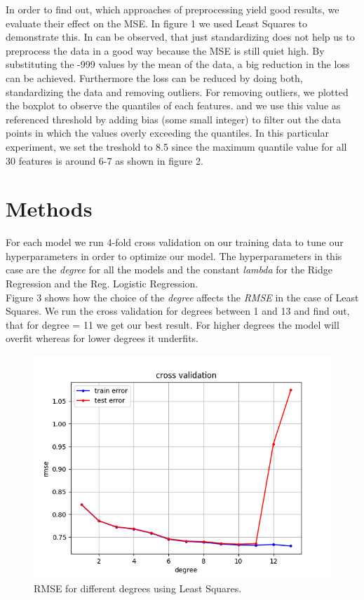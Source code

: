 \documentclass[10pt,conference,compsocconf]{IEEEtran}
\begin{document}
In order to find out, which approaches of preprocessing yield good results, we evaluate their effect on the MSE. In figure 1 we used Least Squares to demonstrate this. In can be observed, that just standardizing does not help us to preprocess the data in a good way because the MSE is still quiet high. 
By substituting the -999 values by the mean of the data, a big reduction in the loss can be achieved. Furthermore the loss can be reduced by doing both, standardizing the data and removing outliers. For removing outliers, we plotted the boxplot to observe the quantiles of each features. and we use this value as referenced threshold by adding bias (some small integer) to filter out the data points in which the values overly exceeding the quantiles. In this particular experiment, we set the treshold to 8.5 since the maximum quantile value for all 30 features is around 6-7 as shown in figure 2.\\



\section{Methods}
\label{sec:tips-writing}


For each model we run 4-fold cross validation on our training data to tune our hyperparameters in order to optimize our model. The hyperparameters in this case are the \textit{degree} for all the models and the constant \textit{lambda} for the Ridge Regression and the Reg. Logistic Regression.
\\
Figure 3 shows how the choice of the \textit{degree} affects the \textit{RMSE} in the case of Least Squares. We run the cross validation for degrees between 1 and 13 and find out, that for degree = 11 we get our best result. For higher degrees the model will overfit whereas for lower degrees it underfits.

\begin{figure}[htbp]
  \centering
  \includegraphics[width=\columnwidth]{cross_validation_leastsquares.png}
  \caption{RMSE for different degrees using Least Squares.}
  \vspace{-3mm}
  \label{fig:crossvalidationleastsquares}
\end{figure}
\end{document}
